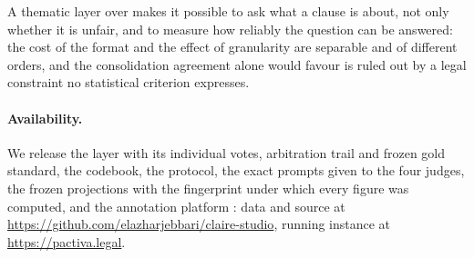 A thematic layer over \corpus{} makes it possible to ask what a clause is about,
not only whether it is unfair, and to measure how reliably the question can be
answered: the cost of the format and the effect of granularity are separable and
of different orders, and the consolidation agreement alone would favour is ruled
out by a legal constraint no statistical criterion expresses.

\paragraph{Availability.}
We release the layer with its individual votes, arbitration trail and frozen gold
standard, the codebook, the protocol, the exact prompts given to the four judges,
the frozen projections with the fingerprint under which every figure was
computed, and the annotation platform \cite{stenetorp2012brat,klie2018inception,pei2022potato}: data and source
at \url{https://github.com/elazharjebbari/claire-studio}, running instance at
\url{https://pactiva.legal}.
